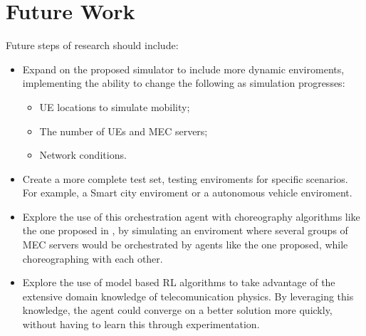 \section{Future Work}
\noindent Future steps of research should include:
\begin{itemize}
    \item Expand on the proposed simulator to include more dynamic enviroments, implementing the ability to change the following as simulation progresses:
    \begin{itemize}
      \item \acrshort{UE} locations to simulate mobility;
      \item The number of \acrshort{UE}s and \acrshort{MEC} servers;
      \item Network conditions.
    \end{itemize}
    \item Create a more complete test set, testing enviroments for specific scenarios. For example, a Smart city enviroment or a autonomous vehicle enviroment. 
    \item Explore the use of this orchestration agent with choreography algorithms like the one proposed in \cite{Lulu}, by simulating an enviroment where several groups of \acrshort{MEC} servers would be orchestrated by agents like the one proposed, while choreographing with each other.
    \item Explore the use of model based \acrshort{RL} algorithms to take advantage of the extensive domain knowledge of telecomunication physics. By leveraging this knowledge, the agent could converge on a better solution more quickly, without having to learn this through experimentation.
\end{itemize}